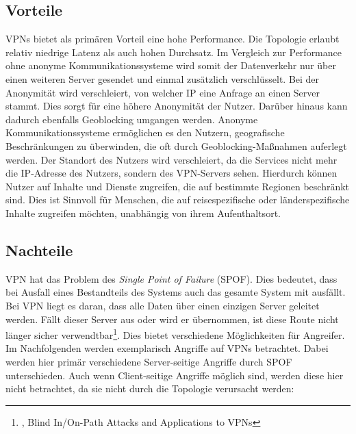 \subsection{Vorteile}
\label{chap:vpn_advantages}

VPNs bietet als primären Vorteil eine hohe Performance. Die Topologie erlaubt relativ niedrige Latenz als auch hohen Durchsatz. Im Vergleich zur Performance ohne anonyme Kommunikationssysteme wird somit der Datenverkehr nur über einen weiteren Server gesendet und einmal zusätzlich verschlüsselt.
Bei der Anonymität wird verschleiert, von welcher IP eine Anfrage an einen Server stammt. Dies sorgt für eine höhere Anonymität der Nutzer. Darüber hinaus kann dadurch ebenfalls Geoblocking umgangen werden. Anonyme Kommunikationssysteme ermöglichen es den Nutzern, geografische Beschränkungen zu überwinden, die oft durch Geoblocking-Maßnahmen auferlegt werden. Der Standort des Nutzers wird verschleiert, da die Services nicht mehr die IP-Adresse des Nutzers, sondern des VPN-Servers sehen. Hierdurch können Nutzer auf Inhalte und Dienste zugreifen, die auf bestimmte Regionen beschränkt sind. Dies ist Sinnvoll für Menschen, die auf reisespezifische oder länderspezifische Inhalte zugreifen möchten, unabhängig von ihrem Aufenthaltsort.

\subsection{Nachteile}
\label{chap:vpn_disadvantages}

VPN hat das Problem des \textit{Single Point of Failure} (SPOF). Dies bedeutet, dass bei Ausfall eines Bestandteils des Systems auch das gesamte System mit ausfällt. Bei VPN liegt es daran, dass alle Daten über einen einzigen Server geleitet werden. Fällt dieser Server aus oder wird er übernommen, ist diese Route nicht länger sicher verwendtbar\footnote{\cite{AttacksOnVPNs}, Blind In/On-Path Attacks and Applications to VPNs}.
Dies bietet verschiedene Möglichkeiten für Angreifer. Im Nachfolgenden werden exemplarisch Angriffe auf VPNs betrachtet. Dabei werden hier primär verschiedene Server-seitige Angriffe durch SPOF unterschieden. Auch wenn Client-seitige Angriffe möglich sind, werden diese hier nicht betrachtet, da sie nicht durch die Topologie verursacht werden:

